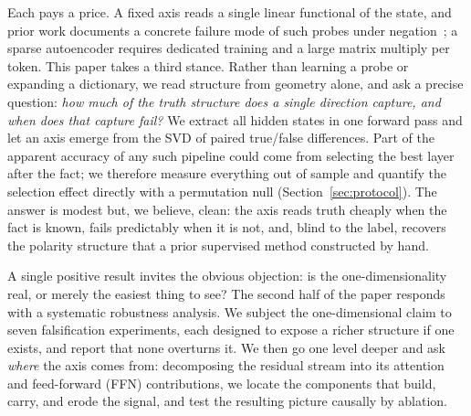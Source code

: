 \documentclass[11pt]{article}
\begin{document}
Each pays a price. A fixed axis reads a single linear functional of the state,
and prior work documents a concrete failure mode of such probes under
negation~\cite{burger2024}; a sparse autoencoder requires dedicated training
and a large matrix multiply per token. This paper takes a third stance. Rather
than learning a probe or expanding a dictionary, we read structure from
geometry alone, and ask a precise question: \emph{how much of the truth
structure does a single direction capture, and when does that capture fail?}
We extract all hidden states in one forward pass and let an axis emerge from
the SVD of paired true/false differences. Part of the apparent accuracy of any
such pipeline could come from selecting the best layer after the fact; we
therefore measure everything out of sample and quantify the selection effect
directly with a permutation null (Section~\ref{sec:protocol}). The answer is
modest but, we believe, clean: the axis reads truth cheaply when the fact is
known, fails predictably when it is not, and, blind to the label, recovers the
polarity structure that a prior supervised method constructed by hand.

A single positive result invites the obvious objection: is the
one-dimensionality real, or merely the easiest thing to see? The second half
of the paper responds with a systematic robustness analysis. We subject the
one-dimensional claim to seven falsification experiments, each designed to
expose a richer structure if one exists, and report that none overturns it. We
then go one level deeper and ask \emph{where} the axis comes from: decomposing
the residual stream into its attention and feed-forward (FFN) contributions,
we locate the components that build, carry, and erode the signal, and test the
resulting picture causally by ablation.
\end{document}
